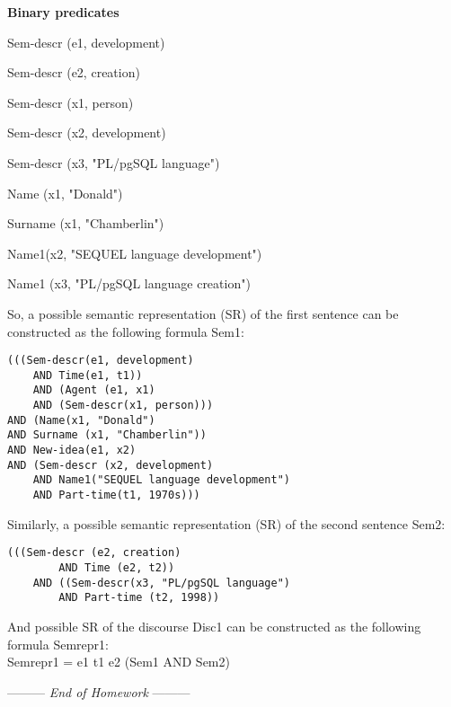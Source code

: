 \documentclass[a4paper,12pt,fleqn]{article}
\newcommand{\lastwords}{End of Homework}
\begin{document}
\textbf{Binary predicates}
\begin{compactenum}
\item Sem-descr (e1, development)
\item Sem-descr (e2, creation)
\item Sem-descr (x1, person)
\item Sem-descr (x2, development)
\item Sem-descr (x3, "PL/pgSQL language")
\item Name (x1, "Donald")
\item Surname (x1, "Chamberlin")
\item Name1(x2, "SEQUEL language development")
\item Name1 (x3, "PL/pgSQL language creation")
\end{compactenum}

\vspace{1cm}

So, a possible semantic representation (SR) of the first sentence can be constructed as the following formula Sem1: \\
\begin{verbatim}
(((Sem-descr(e1, development)
    AND Time(e1, t1))
    AND (Agent (e1, x1)
    AND (Sem-descr(x1, person)))
AND (Name(x1, "Donald")
AND Surname (x1, "Chamberlin"))
AND New-idea(e1, x2)
AND (Sem-descr (x2, development)
    AND Name1("SEQUEL language development")
    AND Part-time(t1, 1970s)))
\end{verbatim}

Similarly, a possible semantic representation (SR) of the second sentence Sem2:\\
\begin{verbatim}
(((Sem-descr (e2, creation)
        AND Time (e2, t2))
    AND ((Sem-descr(x3, "PL/pgSQL language")
        AND Part-time (t2, 1998))
\end{verbatim}

And possible SR of the discourse Disc1 can be constructed as the following formula Semrepr1: \\
 Semrepr1 = \exists e1 \exists t1 \exists e2    
  (Sem1 AND Sem2)

\begin{center}
\vspace{3cm}
--------- \textit{\lastwords} ---------
\end{center}
\\

\label{finalpage}
\end{document}
